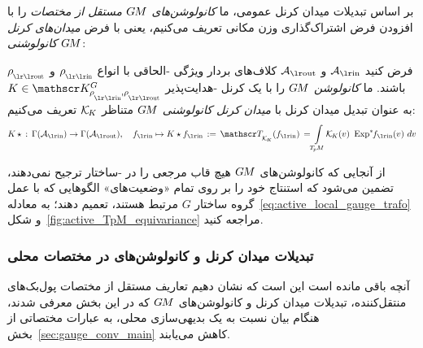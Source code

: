 بر اساس تبدیلات میدان کرنل عمومی، ما \emph{کانولوشن‌های $\GM$ مستقل از مختصات} را با افزودن فرض اشتراک‌گذاری وزن مکانی تعریف می‌کنیم، یعنی با فرض \emph{میدان‌های کرنل کانولوشنی} $\GM$:
\begin{dfn}[کانولوشن $\GM$]
\label{dfn:coord_free_conv}
    فرض کنید $\Ain$ و $\Aout$ کلاف‌های بردار ویژگی -الحاقی با انواع $\rhoin$ و $\rhoout$ باشند.
    ما \emph{کانولوشن $\GM$} را با یک کرنل -هدایت‌پذیر $K\in\KG$ به عنوان تبدیل میدان کرنل با \emph{میدان کرنل کانولوشنی} $\GM$ متناظر $\mathcal{K}_{\mkern-2mu K}$ تعریف می‌کنیم:
    \begin{align}\label{eq:coord_free_conv_def_signature}
        K\,\star\,:\, \Gamma(\Ain)\to \Gamma(\Aout), \quad
        \fin \mapsto K\star \fin \,:=\, \TKK(\fin)
        \,=\! \int\limits_{\TpM}\! \KK(v)\ \Expsfin(v)\ dv
    \end{align}
\end{dfn}
از آنجایی که کانولوشن‌های $\GM$ هیچ قاب مرجعی را در -ساختار ترجیح نمی‌دهند، تضمین می‌شود که استنتاج خود را بر روی تمام «وضعیت‌های» الگوهایی که با عمل گروه ساختار $G$ مرتبط هستند، تعمیم دهند؛ به معادله~\eqref{eq:active_local_gauge_trafo} و شکل~\ref{fig:active_TpM_equivariance} مراجعه کنید.












\subsubsection{تبدیلات میدان کرنل و کانولوشن‌های  در مختصات محلی}
\label{sec:KFTs_GM-conv_local}

آنچه باقی مانده است این است که نشان دهیم تعاریف مستقل از مختصات پول‌بک‌های منتقل‌کننده، تبدیلات میدان کرنل و کانولوشن‌های $\GM$ که در این بخش معرفی شدند، هنگام بیان نسبت به یک بدیهی‌سازی محلی، به عبارات مختصاتی از بخش~\ref{sec:gauge_conv_main} کاهش می‌یابند.

